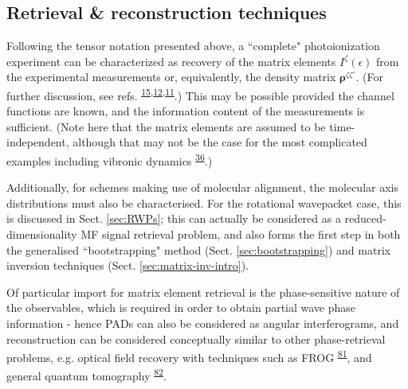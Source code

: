 \documentclass[10pt]{article}
\begin{document}






\subsection{Retrieval \& reconstruction techniques\label{sec:recon-techniques-intro}}


Following the tensor notation presented above, a ``complete" photoionization experiment can be characterized as recovery of the matrix elements $I^{\zeta}(\epsilon)$ from the experimental measurements or, equivalently, the density matrix $\mathbf{\rho}^{\zeta\zeta'}$. (For further discussion, see refs. \textsuperscript{\hyperref[csl:15]{15},\hyperref[csl:12]{12},\hyperref[csl:11]{11}}.) This may be possible provided the channel functions are known, and the information content of the measurements is sufficient. (Note here that the matrix elements are assumed to be time-independent, although that may not be the case for the most complicated examples including vibronic dynamics \textsuperscript{\hyperref[csl:36]{36}}.) 

Additionally, for schemes making use of molecular alignment, the molecular axis distributions must also be characterised. For the rotational wavepacket case, this is discussed in Sect. \ref{sec:RWPs}; this can actually be considered as a reduced-dimensionality MF signal retrieval problem, and also forms the first step in both the generalised ``bootstrapping" method (Sect. \ref{sec:bootstrapping}) and matrix inversion techniques (Sect. \ref{sec:matrix-inv-intro}).

Of particular import for matrix element retrieval is the phase-sensitive nature of the observables, which is required in order to obtain partial wave phase information - hence PADs can also be considered as angular interferograms, and reconstruction can be considered conceptually similar to other phase-retrieval problems, e.g. optical field recovery with techniques such as FROG \textsuperscript{\hyperref[csl:81]{81}}, and general quantum tomography \textsuperscript{\hyperref[csl:82]{82}}. 
\end{document}

